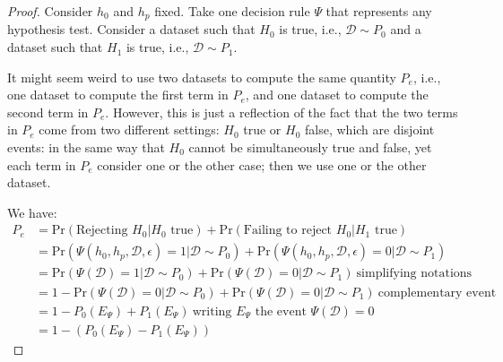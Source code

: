 \begin{proof}
    Consider $h_0$ and $h_p$ fixed. Take one decision rule $\Psi$ that represents any hypothesis test. Consider a dataset such that $H_0$ is true, i.e., $\mathcal{D} \sim P_0$ and a dataset such that $H_1$ is true, i.e., $\mathcal{D} \sim P_1$. 
    
    It might seem weird to use two datasets to compute the same quantity $P_e$, i.e., one dataset to compute the first term in $P_e$, and one dataset to compute the second term in $P_e$. However, this is just a reflection of the fact that the two terms in $P_e$ come from two different settings: $H_0$ true or $H_0$ false, which are disjoint events: in the same way that $H_0$ cannot be simultaneously true and false, yet each term in $P_e$ consider one or the other case; then we use one or the other dataset. 
    
    We have:
    \begin{align*}
        P_e 
        &= 
        \text{Pr}(\text{Rejecting $H_0$} | \text{$H_0$ true}) 
        +
        \text{Pr}(\text{Failing to reject $H_0$} | \text{$H_1$ true})
        \\
        &= 
        \text{Pr}(\Psi(h_0, h_p, \mathcal{D}, \epsilon) = 1 | \mathcal{D} \sim P_0) 
        +
        \text{Pr}(\Psi(h_0, h_p, \mathcal{D}, \epsilon) = 0 |
        \mathcal{D} \sim P_1)
        \\
        &= 
        \text{Pr}(\Psi(\mathcal{D}) = 1 | \mathcal{D} \sim P_0) 
        +
        \text{Pr}(\Psi(\mathcal{D}) = 0 |
        \mathcal{D} \sim P_1)
~\text{simplifying notations}
        \\
        &= 
        1 - \text{Pr}(\Psi(\mathcal{D}) = 0 | \mathcal{D} \sim P_0) 
        +
        \text{Pr}(\Psi(\mathcal{D}) = 0 |
        \mathcal{D} \sim P_1)
~\text{complementary event}
        \\
        &= 
        1 
        - P_0(E_\Psi) 
        +
        P_1(E_\Psi)
~\text{writing $E_\Psi$ the event $\Psi(\mathcal{D}) = 0$}\\
        &= 
        1 - (P_0(E_\Psi) - P_1(E_\Psi))
    \end{align*}


\end{proof}
